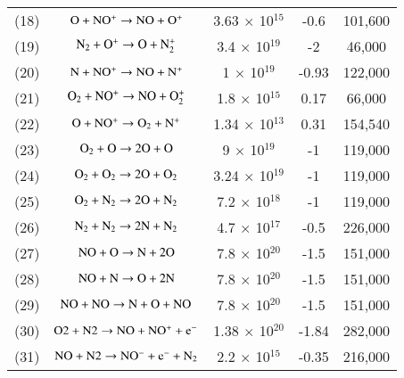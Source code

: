 \documentclass{warpdoc}
\begin{document}
\begin{table}[t]
\begin{center}
\begin{threeparttable}
\begin{tabular}{ccccc}
(18) & $\rm O + NO^+ \rightarrow NO + O^+$ & 3.63 $\times$ 10$^{15}$ & -0.6 & 101,600 \\
(19) & $\rm N_2 + O^+ \rightarrow O + N_2^{+}$ & 3.4 $\times$ 10$^{19}$ & -2 & 46,000 \\
(20) & $\rm N + NO^+ \rightarrow NO + N^+$ & 1 $\times$ 10$^{19}$ & -0.93 & 122,000 \\
(21) & $\rm O_2 + NO^+ \rightarrow NO + O_2^{+}$ & 1.8 $\times$ 10$^{15}$ & 0.17 & 66,000 \\
(22) & $\rm O + NO^+ \rightarrow O_2 + N^+$ & 1.34 $\times$ 10$^{13}$ & 0.31 & 154,540 \\
(23) & $\rm O_2 + O \rightarrow 2O + O$ & 9 $\times$ 10$^{19}$ & -1 & 119,000 \\
(24) & $\rm O_2 + O_2 \rightarrow 2O + O_2$ & 3.24 $\times$ 10$^{19}$ & -1 & 119,000 \\
(25) & $\rm O_2 + N_2 \rightarrow 2O + N_2$ & 7.2 $\times$ 10$^{18}$ & -1 & 119,000 \\
(26) & $\rm N_2 + N_2 \rightarrow 2N + N_2$ & 4.7 $\times$ 10$^{17}$ & -0.5 & 226,000 \\
(27) & $\rm NO + O \rightarrow N + 2O$ & 7.8 $\times$ 10$^{20}$ & -1.5 & 151,000 \\
(28) & $\rm NO + N \rightarrow O + 2N$ & 7.8 $\times$ 10$^{20}$ & -1.5 & 151,000 \\
(29) & $\rm NO + NO \rightarrow N + O + NO$ & 7.8 $\times$ 10$^{20}$ & -1.5 & 151,000 \\
(30) & $\rm O2 + N2 \rightarrow NO + NO^+ + e^-$ & 1.38 $\times$ 10$^{20}$ & -1.84 & 282,000 \\
(31) & $\rm NO + N2 \rightarrow NO^- + e^- + N_2$ & 2.2 $\times$ 10$^{15}$ & -0.35 & 216,000 \\
\bottomrule
\end{tabular}
\label{tab:dunn-kang}
\end{threeparttable}
\end{center}
\end{table}
%
\end{document}
